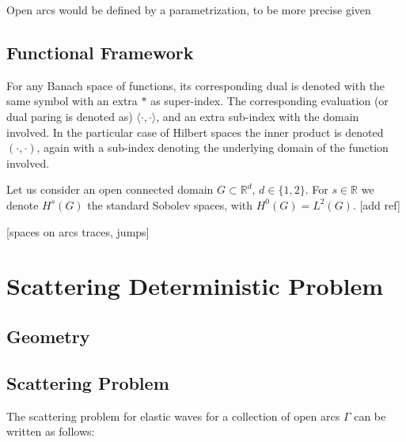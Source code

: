 \documentclass{article}
\newcommand{\todo}[1]{{\color{red}[#1]}}
\begin{document}
Open arcs would be defined by a parametrization, to be more precise given 

\subsection{Functional Framework}

For any Banach space of functions, its corresponding dual is denoted with the same symbol with an extra $*$ as super-index. The corresponding evaluation (or dual paring is denoted as) $\langle \cdot , \cdot \rangle$, and an extra sub-index with the domain involved. In the particular case of Hilbert spaces the inner product is denoted $\left( \cdot, \cdot \right)$, again with a sub-index denoting the underlying domain of the function involved. 

Let us consider an open connected domain $G \subset \mathbb{R}^d$, $d \in \{1,2\}$. For $s \in \mathbb{R}$ we denote $H^s(G)$ the standard Sobolev spaces, with $H^0(G) = L^2(G)$. \todo{add ref} 

\todo{spaces on arcs  traces, jumps}



  

\section{Scattering Deterministic Problem}

\subsection{Geometry}
\subsection{Scattering Problem}



The scattering problem for elastic waves for a collection of open arcs $\Gamma$ can be written as follows: 
\end{document}
